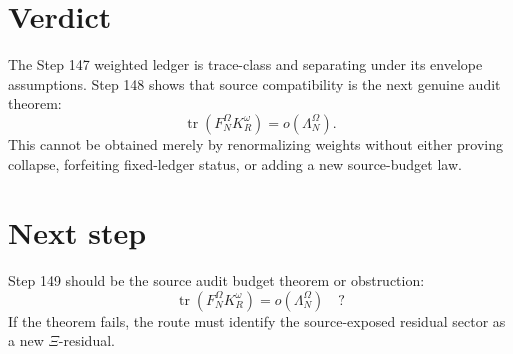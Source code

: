\documentclass[11pt]{article}
\begin{document}
\section{Verdict}
The Step 147 weighted ledger is trace-class and separating under its envelope assumptions. Step 148 shows that source compatibility is the next genuine audit theorem:
\[
\boxed{
  \operatorname{tr}(F_N^\Omega K_R^\omega)=o(\Lambda_N^\Omega).
}
\]
This cannot be obtained merely by renormalizing weights without either proving collapse, forfeiting fixed-ledger status, or adding a new source-budget law.

\section{Next step}
Step 149 should be the source audit budget theorem or obstruction:
\[
\boxed{
  \operatorname{tr}(F_N^\Omega K_R^\omega)=o(\Lambda_N^\Omega)
  \quad ?
}
\]
If the theorem fails, the route must identify the source-exposed residual sector as a new $\Xi$-residual.
\end{document}
